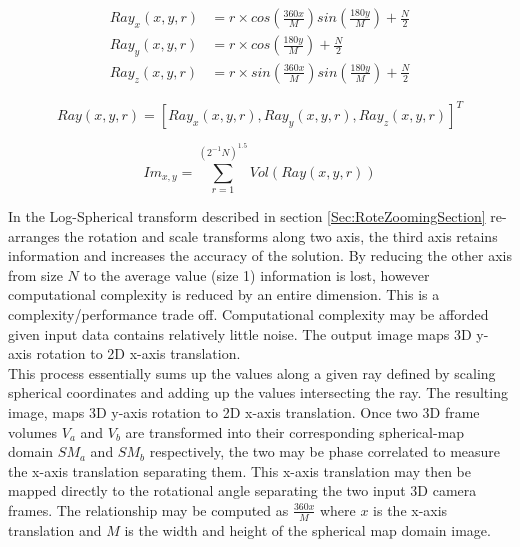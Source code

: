\begin{equation} \label{eqn:invLPFuncs}
\begin{split}
Ray_x(x,y,r) & = r \times cos\left(\frac{360x}{M}\right)sin\left(\frac{180y}{M}\right)  + \frac{N}{2} \\
Ray_y(x,y,r) & = r \times cos\left(\frac{180y}{M}\right) + \frac{N}{2} \\
Ray_z(x,y,r) & = r \times sin\left(\frac{360x}{M}\right)sin\left(\frac{180y}{M}\right) + \frac{N}{2}
\end{split}
\end{equation}

\begin{equation} \label{eqn:invLPVVF}
Ray(x,y,r) = [Ray_x(x,y,r), Ray_y(x,y,r), Ray_z(x,y,r)]^T
\end{equation}

\begin{equation} \label{eqn:smtUpdate}
Im_{x,y} = \sum_{r=1}^{(2^{-1}N)^{1.5}}{Vol(Ray(x,y,r))} 
\end{equation}

In the Log-Spherical transform described in section \ref{Sec:RoteZoomingSection} re-arranges the rotation and scale transforms along two axis, the third axis retains information and increases the accuracy of the solution. By reducing the other axis from size $N$ to the average value (size 1) information is lost, however computational complexity is reduced by an entire dimension. This is a complexity/performance trade off. Computational complexity may be afforded given input data contains relatively little noise. The output image maps 3D y-axis rotation to 2D x-axis translation. \\


This process essentially sums up the values along a given ray defined by scaling spherical coordinates and adding up the values intersecting the ray. The resulting image, maps 3D y-axis rotation to 2D x-axis translation. Once two 3D frame volumes $V_a$ and $V_b$ are transformed into their corresponding spherical-map domain $SM_a$ and $SM_b$ respectively, the two may be phase correlated to measure the x-axis translation separating them. This x-axis translation may then be mapped directly to the rotational angle separating the two input 3D camera frames. The relationship may be computed as $\frac{360x}{M}$ where $x$ is the x-axis translation and $M$ is the width and height of the spherical map domain image. \\


